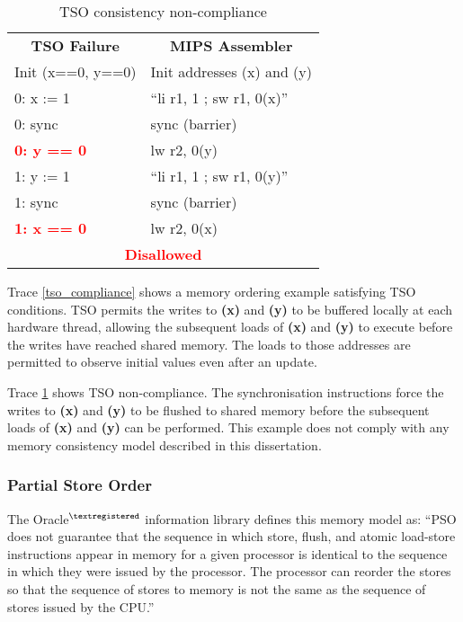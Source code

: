 			\captionsetup[table]{name=Trace}
			\begin{table}[!hb]
			\begin{center}
			\selectfont
			\begin{tabular}{|l|l|}
				\hline
				\multicolumn{1}{|c|}{\textbf{TSO Failure}} & \multicolumn{1}{c|}{\textbf{MIPS Assembler}} \\
				Init (x==0, y==0) & Init addresses (x) and (y) \\
				\hline
				0: x := 1 &  ``li r1, 1 ; sw r1, 0(x)'' \\
				0: sync & sync (barrier) \\
				\textbf{\textcolor{red}{0: y == 0}} & lw r2, 0(y) \\
				1: y := 1 & ``li r1, 1 ; sw r1, 0(y)'' \\
				1: sync & sync (barrier) \\
				\textbf{\textcolor{red}{1: x == 0}} & lw r2, 0(x) \\
				\hline
				\multicolumn{2}{|c|}{\textbf{\textcolor{red}{Disallowed}}} \\
				\hline
			\end{tabular}
			\caption{TSO consistency non-compliance}
			\label{tso_non_compliance}
			\end{center} 
			\end{table}
			\captionsetup[table]{name=Table}

			
			Trace \ref{tso_compliance} shows a memory ordering example satisfying TSO conditions. TSO permits the writes to \textbf{(x)} and \textbf{(y)} to be buffered locally at each hardware thread, allowing the subsequent loads of \textbf{(x)} and \textbf{(y)} to execute before the writes have reached shared memory. The loads to those addresses are permitted to observe initial values even after an update.

			Trace \ref{tso_non_compliance} shows TSO non-compliance. The synchronisation instructions force the writes to \textbf{(x)} and \textbf{(y)} to be flushed to shared memory before the subsequent loads of \textbf{(x)} and \textbf{(y)} can be performed. This example does not comply with any memory consistency model described in this dissertation.
			
		\subsubsection{Partial Store Order}
			The Oracle{\tiny{$^{\textregistered}$}} information library \cite{Oracle15} defines this memory model as: ``PSO does not guarantee that the sequence in which store, flush, and atomic load-store instructions appear in memory for a given processor is identical to the sequence in which they were issued by the processor. The processor can reorder the stores so that the sequence of stores to memory is not the same as the sequence of stores issued by the CPU.''
			
